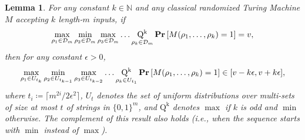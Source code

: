 \documentclass[11pt]{article}
\newtheorem{lemma}[theorem]{Lemma}
\theoremstyle{definition}
\renewcommand{\Pr}{\mathop{\bf Pr\/}}
\newcommand{\nats}{\mathbb N}
\newcommand{\N}{\nats}
\newcommand{\calD}{\mathcal{D}}
\begin{document}
\begin{lemma}\label{lem:lipton}
    For any constant $k \in \N$ and any classical randomized Turing Machine $M$ accepting $k$ length-$m$ inputs, if
    \[
        \max_{\rho_1 \in\calD_m} \min_{\rho_2 \in\calD_m} \max_{\rho_3 \in\calD_m} \dots \operatorname*{Q^k}_{\rho_k \in\calD_m} \Pr\left[M(\rho_1,\dots,\rho_k) = 1\right] = v,
    \]
    then
    for any constant $\epsilon>0$, 
    \[
        \max_{\rho_1\in U_{t_k}} \min_{\rho_2\in U_{t_{k-1}}} \max_{\rho_3 \in U_{t_{k-2}}} \dots \operatorname*{Q^k}_{\rho_k \in U_{t_{1}}} \Pr\left[M(\rho_1,\dots,\rho_k)=1\right] \in [v - k\epsilon, v+k\epsilon] ,
    \]
    where $t_i \coloneqq \lceil m^{2i}/2\epsilon^2 \rceil$, 
    $U_t$ denotes the set of uniform distributions over multi-sets of size at most $t$ of strings in $\{0,1\}^m$,
    and $\operatorname*{Q^k}$ denotes $\max$ if $k$ is odd and $\min$ otherwise.
    The complement of this result also holds (i.e., when the sequence starts with $\min$ instead of $\max$).
\end{lemma}
\end{document}
